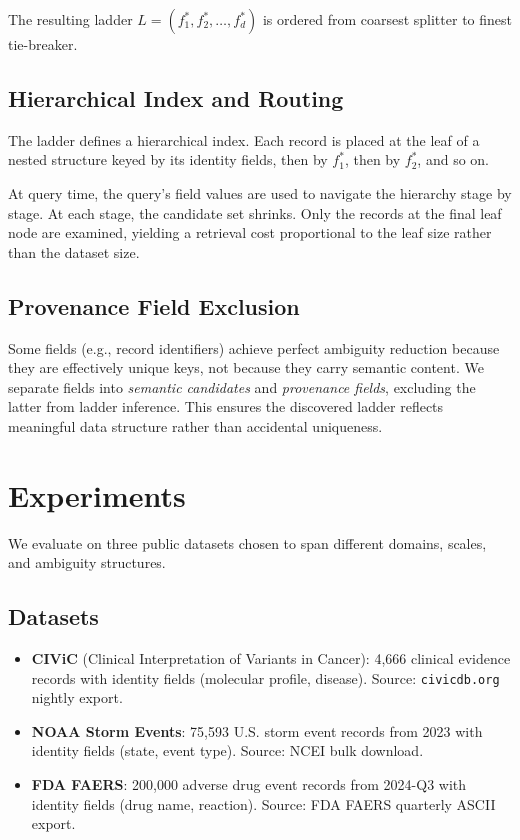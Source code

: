 \documentclass[11pt]{article}
\begin{document}
The resulting ladder $L = (f_1^*, f_2^*, \ldots, f_d^*)$ is ordered from coarsest splitter to finest tie-breaker.

\subsection{Hierarchical Index and Routing}

The ladder defines a hierarchical index. Each record is placed at the leaf of a nested structure keyed by its identity fields, then by $f_1^*$, then by $f_2^*$, and so on.

At query time, the query's field values are used to navigate the hierarchy stage by stage. At each stage, the candidate set shrinks. Only the records at the final leaf node are examined, yielding a retrieval cost proportional to the leaf size rather than the dataset size.

\subsection{Provenance Field Exclusion}

Some fields (e.g., record identifiers) achieve perfect ambiguity reduction because they are effectively unique keys, not because they carry semantic content. We separate fields into \textit{semantic candidates} and \textit{provenance fields}, excluding the latter from ladder inference. This ensures the discovered ladder reflects meaningful data structure rather than accidental uniqueness.

\section{Experiments}

We evaluate on three public datasets chosen to span different domains, scales, and ambiguity structures.

\subsection{Datasets}

\begin{itemize}
\item \textbf{CIViC} (Clinical Interpretation of Variants in Cancer): 4{,}666 clinical evidence records with identity fields (molecular profile, disease). Source: \texttt{civicdb.org} nightly export.
\item \textbf{NOAA Storm Events}: 75{,}593 U.S. storm event records from 2023 with identity fields (state, event type). Source: NCEI bulk download.
\item \textbf{FDA FAERS}: 200{,}000 adverse drug event records from 2024-Q3 with identity fields (drug name, reaction). Source: FDA FAERS quarterly ASCII export.
\end{itemize}
\end{document}
